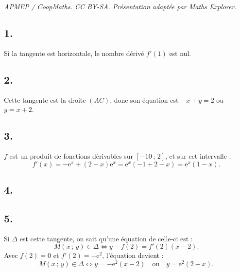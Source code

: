 \documentclass[10pt]{article}
\providecommand{\e}{{\mathrm{e}}}
\begin{document}
\noindent\textit{APMEP / CoopMaths. CC BY-SA. Présentation adaptée par Maths Explorer.}\par\medskip
\subsection*{1.}

Si la tangente est horizontale, le nombre dérivé \(f'(1)\) est nul.

\subsection*{2.}

Cette tangente est la droite \((AC)\), donc son équation est \(-x + y = 2\) ou \(y = x + 2\).

\subsection*{3.}

\(f\) est un produit de fonctions dérivables sur \([-10\,;\,2]\), et sur cet intervalle :
\[
f'(x) = -\e^x + (2 - x) \e^x = \e^x (-1 + 2 - x) = \e^x(1 - x).
\]

\subsection*{4.}

\begin{center}
\end{center}

\subsection*{5.}

Si \(\Delta\) est cette tangente, on sait qu'une équation de celle-ci est :
\[
M(x\,;\,y) \in \Delta \iff y - f(2) = f'(2)(x - 2).
\]
Avec \(f(2) = 0\) et \(f'(2) = -\e^2\), l'équation devient :
\[
M(x\,;\,y) \in \Delta \iff y = -\e^2(x - 2) \quad \text{ou} \quad y = \e^2(2 - x).
\]
\end{document}
